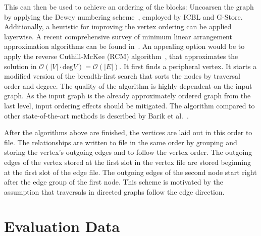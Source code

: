         This can then be used to achieve an ordering of the blocks:
        Uncoarsen the graph by applying the Dewey numbering scheme~\autocite{dewey1894decimal}, employed by ICBL and G-Store.
        Additionally, a heuristic for improving the vertex ordering can be applied layerwise. 
        A recent comprehensive survey of minimum linear arrangement approximation algorithms can be found in~\autocite{barik2020vertex}.
        An appealing option would be to apply the reverse Cuthill-McKee (RCM) algorithm~\autocite{Cuthill1969ReducingTB}, that approximates the solution in $\mathcal{O}(|V| \cdot \text{deg}{V}) = \mathcal{O}(|E|)$. 
        It first finds a peripheral vertex.
        It starts a modified version of the breadth-first search that sorts the nodes by traversal order and degree.
        The quality of the algorithm is highly dependent on the input graph.
        As the input graph is the already approximately ordered graph from the last level, input ordering effects should be mitigated.
        The algorithm compared to other state-of-the-art methods is described by Barik et al.~\autocite{barik2020vertex}.
        
        After the algorithms above are finished, the vertices are laid out in this order to file. 
        The relationships are written to file in the same order by grouping and storing the vertex's outgoing edges and to follow the vertex order.
        The outgoing edges of the vertex stored at the first slot in the vertex file are stored beginning at the first slot of the edge file. 
        The outgoing edges of the second node start right after the edge group of the first node.
        This scheme is motivated by the assumption that traversals in directed graphs follow the edge direction.
        
\chapter{Evaluation Data}
